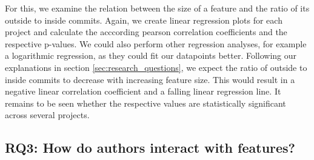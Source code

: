 For this, we examine the relation between the size of a feature and the ratio of its outside to inside commits.
Again, we create linear regression plots for each project and calculate the acccording pearson correlation coefficients and the respective p-values.
We could also perform other regression analyses, for example a logarithmic regression, as they could fit our datapoints better.
Following our explanations in section \ref{sec:research_questions}, we expect the ratio of outside to inside commits to decrease with increasing feature size.
This would result in a negative linear correlation coefficient and a falling linear regression line.
It remains to be seen whether the respective values are statistically significant across several projects.

\subsection*{\textbf{RQ3: How do authors interact with features?}}

